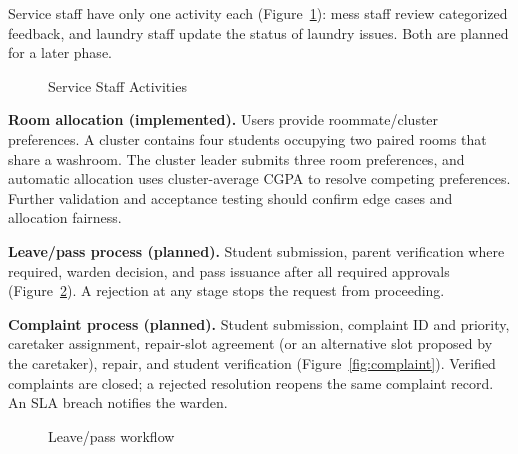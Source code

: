 \documentclass[11pt,a4paper]{article}
\numberwithin{figure}{section}   %
\newcommand{\card}[5]{%
  \node[chead,anchor=north] (#1h) at (#2,#3) {#4};
  \foreach \itm [count=\i] in {#5} {%
    \pgfmathtruncatemacro{\pv}{\i-1}%
    \ifnum\i=1
      \node[citem,below=0pt of #1h,fill=gray!28] (#1\i) {\itm};%
    \else
      \ifodd\i
        \node[citem,below=0pt of #1\pv,fill=gray!28] (#1\i) {\itm};%
      \else
        \node[citem,below=0pt of #1\pv,fill=gray!12] (#1\i) {\itm};%
      \fi
    \fi}}
\newcommand{\roleframe}[2]{%
  \node[draw,fit=#1,inner sep=8pt] (frm) {};
  \node[below=3pt of frm,font=\bfseries\small\sffamily] {#2};}
\begin{document}
Service staff have only one activity each (Figure~\ref{fig:service}): mess staff review categorized feedback, and laundry staff update the status of laundry issues. Both are planned for a later phase.

\begin{figure}[H]
\centering
{}  
\caption{Service Staff Activities}
\label{fig:service}
\end{figure}

\textbf{Room allocation (implemented).} Users provide roommate/cluster preferences. A cluster contains four students occupying two paired rooms that share a washroom. The cluster leader submits three room preferences, and automatic allocation uses cluster-average CGPA to resolve competing preferences. Further validation and acceptance testing should confirm edge cases and allocation fairness.

\textbf{Leave/pass process (planned).} Student submission, parent verification where required, warden decision, and pass issuance after all required approvals (Figure~\ref{fig:leave}). A rejection at any stage stops the request from proceeding.

\textbf{Complaint process (planned).} Student submission, complaint ID and priority, caretaker assignment, repair-slot agreement (or an alternative slot proposed by the caretaker), repair, and student verification (Figure~\ref{fig:complaint}). Verified complaints are closed; a rejected resolution reopens the same complaint record. An SLA breach notifies the warden.

\begin{figure}[H]
\centering
{}
\caption{Leave/pass workflow}
\label{fig:leave}
\end{figure}
\end{document}
